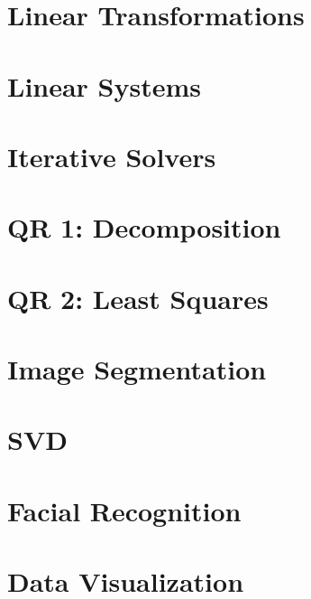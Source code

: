 
\section*{Linear Transformations} %

\section*{Linear Systems} %

\section*{Iterative Solvers} %

\section*{QR 1: Decomposition} %

\section*{QR 2: Least Squares} %

\section*{Image Segmentation} %

\section*{SVD} %

\section*{Facial Recognition} %

\section*{Data Visualization} %
